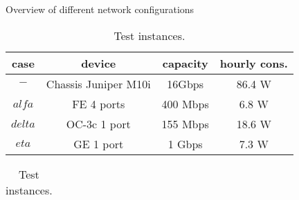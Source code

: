 \documentclass[final,5p,times,twocolumn]{elsarticle}
\begin{document}
\begin{table}[!htc]
  \centering
  \caption{Overview of different network configurations}\label{tab_card_device}
  \begin{tabular}{c|c|c c}
    \hline 
case & device       & capacity  & hourly cons. \\ 
          \hline
          $-$ & Chassis Juniper M10i & 16Gbps & 86.4 W\\
          \hline
    $alfa$ & FE 4 ports   & 400 Mbps  & 6.8 W \\
    $delta$ & OC-3c 1 port & 155 Mbps  & 18.6 W\\
    $eta$   & GE 1 port    & 1 Gbps    & 7.3 W\\
    \hline 
  \end{tabular}

\vspace{0.5cm}
\footnotesize
\tabcolsep 5pt
\caption{Test instances.}
\begin{center}
\begin{tabular}{ccccccc}

\hline


\end{tabular}
\end{center}
\end{table}
\end{document}
